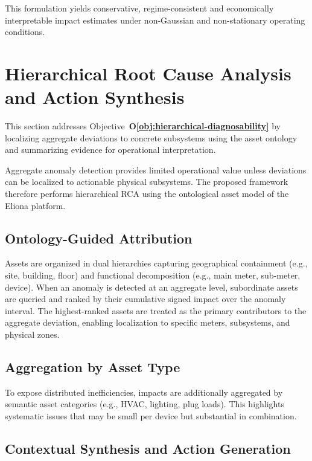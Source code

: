 This formulation yields conservative, regime-consistent and economically interpretable
impact estimates under non-Gaussian and non-stationary operating conditions.

\section{Hierarchical Root Cause Analysis and Action Synthesis}
\label{sec:root-cause-analysis}

This section addresses Objective~\textbf{O\ref{obj:hierarchical-diagnosability}} by
localizing aggregate deviations to concrete subsystems using the asset ontology and
summarizing evidence for operational interpretation.

Aggregate anomaly detection provides limited operational value unless deviations can be
localized to actionable physical subsystems. The proposed framework therefore performs
hierarchical \ac{RCA} using the ontological asset model of the Eliona
platform.

\subsection{Ontology-Guided Attribution}

Assets are organized in dual hierarchies capturing geographical containment (e.g., site,
building, floor) and functional decomposition (e.g., main meter, sub-meter, device).
When an anomaly is detected at an aggregate level, subordinate assets are queried and
ranked by their cumulative signed impact over the anomaly interval. The highest-ranked
assets are treated as the primary contributors to the aggregate deviation, enabling
localization to specific meters, subsystems, and physical zones.

\subsection{Aggregation by Asset Type}

To expose distributed inefficiencies, impacts are additionally aggregated by semantic
asset categories (e.g., \ac{HVAC}, lighting, plug loads). This highlights systematic issues
that may be small per device but substantial in combination.

\subsection{Contextual Synthesis and Action Generation}

